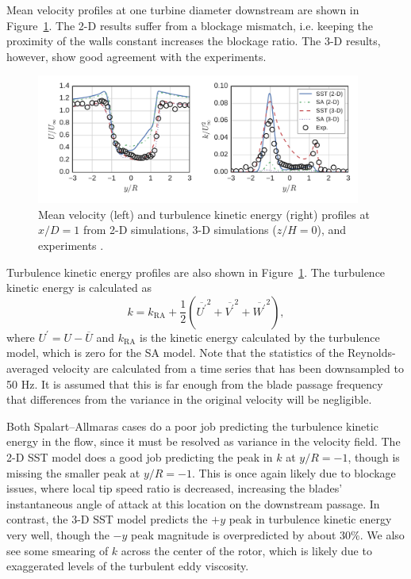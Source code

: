 \documentclass[aip,graphicx]{revtex4-1}
\begin{document}
Mean velocity profiles at one turbine diameter downstream are shown in
Figure~\ref{fig:profiles}. The 2-D results suffer from a blockage mismatch, i.e.
keeping the proximity of the walls constant increases the blockage ratio. The
3-D results, however, show good agreement with the experiments.

\begin{figure}
    \centering

    \includegraphics[width=0.95\textwidth]{figures/profiles}

    \caption{Mean velocity (left) and turbulence kinetic energy (right) profiles
        at $x/D=1$ from 2-D simulations, 3-D simulations ($z/H=0$), and experiments
        \cite{Bachant2015-JoT}.}

    \label{fig:profiles}
\end{figure}

Turbulence kinetic energy profiles are also shown in Figure~\ref{fig:profiles}.
The turbulence kinetic energy is calculated as
\begin{equation}
    k = k_{\mathrm{RA}} + \frac{1}{2} \left(
    \overline{U^\prime}^2 +
    \overline{V^\prime}^2 +
    \overline{W^\prime}^2 \right),
    \label{eq:k}
\end{equation}
where $U^\prime = U - \overline{U}$ and $k_{\mathrm{RA}}$ is the kinetic energy
calculated by the turbulence model, which is zero for the SA model. Note that
the statistics of the Reynolds-averaged velocity are calculated from a time
series that has been downsampled to 50 Hz. It is assumed that this is far enough
from the blade passage frequency that differences from the variance in the
original velocity will be negligible.

Both Spalart--Allmaras cases do a poor job predicting the turbulence kinetic
energy in the flow, since it must be resolved as variance in the velocity field.
The 2-D SST model does a good job predicting the peak in $k$ at $y/R=-1$, though
is missing the smaller peak at $y/R=-1$. This is once again likely due to
blockage issues, where local tip speed ratio is decreased, increasing the
blades' instantaneous angle of attack at this location on the downstream
passage. In contrast, the 3-D SST model predicts the $+y$ peak in turbulence
kinetic energy very well, though the $-y$ peak magnitude is overpredicted by
about 30\%. We also see some smearing of $k$ across the center of the rotor,
which is likely due to exaggerated levels of the turbulent eddy viscosity.
\end{document}
